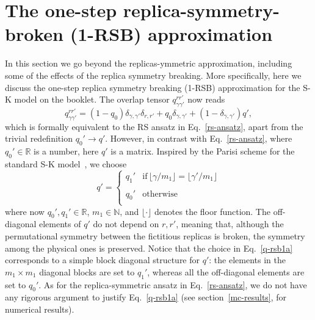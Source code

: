 \documentclass[twocolumn,superscriptaddress,prb,10pt]{revtex4-1}
\begin{document}
\section{The one-step replica-symmetry-broken (1-RSB) approximation}
\label{rsb-1-section}

In this section we go beyond the replicas-ymmetric approximation, including some 
of the effects of the replica symmetry breaking. More specifically, 
here we discuss the one-step replica symmetry breaking (1-RSB) approximation for the 
S-K model on the booklet. The overlap tensor $q_{\gamma\gamma'}^{rr'}$ now reads  
%
\begin{equation}
\label{q-rsb1}
q_{\gamma\gamma'}^{rr'}=(1-q_0)\delta_{\gamma,\gamma'}\delta_{r,r'} +
q_0\delta_{\gamma,\gamma'}+(1-\delta_{\gamma,\gamma'})q', 
\end{equation}
%
which is formally equivalent to the RS ansatz in Eq.~\eqref{rs-ansatz}, apart from 
the trivial redefinition $q_0'\to q'$. However, in contrast with Eq.~\eqref{rs-ansatz}, 
where $q_0'\in\mathbb{R}$ is a number, here $q'$ is a matrix. Inspired by the Parisi 
scheme for the standard S-K model~\cite{parisi-1979}, we choose 
%
\begin{displaymath}
q'=\left\{
\begin{array}{cc}
q_1' & \textrm{if}\, \lfloor\gamma/m_1\rfloor=\lfloor\gamma'/m_1\rfloor\\\\
q_0' & \textrm{otherwise}\\
\end{array}
\right.
\label{q-rsb1a}
\end{displaymath}
%
where now $q_0',q_1'\in{\mathbb R}$, $m_1\in{\mathbb N}$, and $\lfloor\cdot\rfloor$ 
denotes the floor function. The off-diagonal elements of $q'$ do not depend on 
$r,r'$, meaning that, although the permutational symmetry between the 
fictitious replicas is broken, the symmetry among the physical ones is preserved. 
Notice that the choice in Eq.~\eqref{q-rsb1a} corresponds to a simple block 
diagonal structure for $q'$:  the elements in the $m_1\times m_1$ diagonal 
blocks are set to $q_1'$, whereas all the off-diagonal elements are set to 
$q_0'$. As for the replica-symmetric ansatz in Eq.~\eqref{rs-ansatz}, we do 
not have any rigorous argument to justify Eq.~\eqref{q-rsb1a} (see 
section~\eqref{mc-results}, for numerical results).
\end{document}

